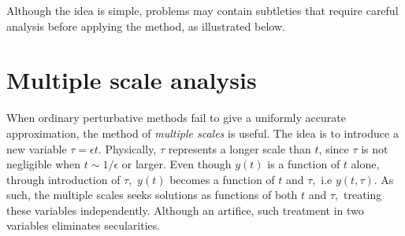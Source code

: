Although the idea is simple, problems may contain subtleties that require careful analysis before applying the method, as illustrated below. 
\label{S2:ex2}

\section{Multiple scale analysis}
When ordinary perturbative methods fail to give a uniformly accurate approximation, the method of \textit{multiple scales} is useful. The idea is to introduce a new variable $\tau = \epsilon t.$ Physically, $\tau$ represents a longer scale than $t$, since $\tau$ is not negligible when $t \sim 1/\epsilon$ or larger. Even though $y(t)$ is a function of $t$ alone, through introduction of $\tau,$ $y(t)$ becomes a function of $t$ and $\tau,$ i.e $y(t, \tau).$ As such, the multiple scales seeks solutions as functions of both $t$ and $\tau,$ treating these variables independently. Although an artifice, such treatment in two variables eliminates secularities.

